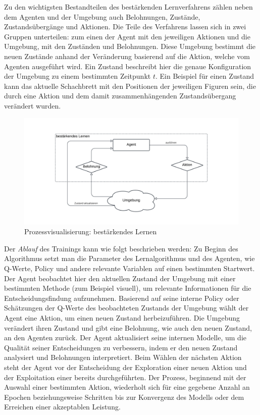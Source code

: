 Zu den wichtigsten Bestandteilen des bestärkenden Lernverfahrens zählen neben dem Agenten und der Umgebung auch Belohnungen, Zustände, Zustandsübergänge und Aktionen. Die Teile des Verfahrens lassen sich in zwei Gruppen unterteilen: zum einen der Agent mit den jeweiligen Aktionen und die Umgebung, mit den Zuständen und Belohnungen. Diese Umgebung bestimmt die neuen Zustände anhand der Veränderung basierend auf die Aktion, welche vom Agenten ausgeführt wird. Ein Zustand beschreibt hier die genaue Konfiguration der Umgebung zu einem bestimmten Zeitpunkt $t$. Ein Beispiel für einen Zustand kann das aktuelle Schachbrett mit den Positionen der jeweiligen Figuren sein, die durch eine Aktion und dem damit zusammenhängenden Zustandsübergang verändert wurden.
\begin{figure}[H]\label{img:reinforcementworkflow}
	\hspace{-10mm}
	\centering
	\includegraphics[width=\linewidth]{Bilder/ReinforcementLearning.png}
	\caption{Prozessvisualisierung: bestärkendes Lernen}
\end{figure}
Der \textit{Ablauf} des Trainings kann wie folgt beschrieben werden: Zu Beginn des Algorithmus setzt man die Parameter des Lernalgorithmus und des Agenten, wie Q-Werte, Policy und andere relevante Variablen auf einen bestimmten Startwert. Der Agent beobachtet hier den aktuellen Zustand der Umgebung mit einer bestimmten Methode (zum Beispiel visuell), um relevante Informationen für die Entscheidungsfindung aufzunehmen. Basierend auf seine interne Policy oder Schätzungen der Q-Werte des beobachteten Zustands der Umgebung wählt der Agent eine Aktion, um einen neuen Zustand herbeizuführen. Die Umgebung verändert ihren Zustand und gibt eine Belohnung, wie auch den neuen Zustand, an den Agenten zurück. Der Agent aktualisiert seine internen Modelle, um die Qualität seiner Entscheidungen zu verbessern, indem er den neuen Zustand analysiert und Belohnungen interpretiert. Beim Wählen der nächsten Aktion steht der Agent vor der Entscheidung der Exploration einer neuen Aktion und der Exploitation einer bereits durchgeführten. Der Prozess, beginnend mit der Auswahl einer bestimmten Aktion, wiederholt sich für eine gegebene Anzahl an Epochen beziehungsweise Schritten bis zur Konvergenz des Modells oder dem Erreichen einer akzeptablen Leistung.


